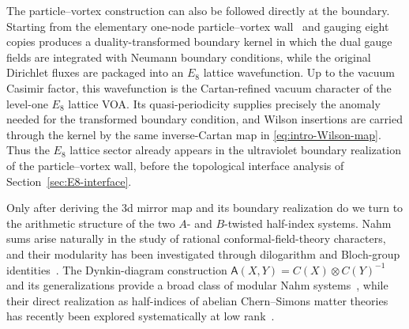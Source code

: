 \documentclass[11pt,a4paper]{article}
\numberwithin{equation}{section}
\begin{document}
The particle--vortex construction can also be followed directly at the boundary.  Starting from the elementary one-node particle--vortex wall~\cite{Dimofte:2017tpi} and gauging eight copies produces a duality-transformed boundary kernel in which the dual gauge fields are integrated with Neumann boundary conditions, while the original Dirichlet fluxes are packaged into an $E_8$ lattice wavefunction.  Up to the vacuum Casimir factor, this wavefunction is the Cartan-refined vacuum character of the level-one $E_8$ lattice VOA.  Its quasi-periodicity supplies precisely the anomaly needed for the transformed boundary condition, and Wilson insertions are carried through the kernel by the same inverse-Cartan map in \eqref{eq:intro-Wilson-map}.  Thus the $E_8$ lattice sector already appears in the ultraviolet boundary realization of the particle--vortex wall, before the topological interface analysis of Section~\ref{sec:E8-interface}.

Only after deriving the 3d mirror map and its boundary realization do we turn to the arithmetic structure of the two $A$- and $B$-twisted half-index systems.  Nahm sums arise naturally in the study of rational conformal-field-theory characters, and their modularity has been investigated through dilogarithm and Bloch-group identities~\cite{Nahm:2004bloch,Zagier:2007dilogarithm,VlasenkoZwegers:2011nahm}.  The Dynkin-diagram construction $\mathsf A(X,Y)=C(X)\otimes C(Y)^{-1}$ and its generalizations provide a broad class of modular Nahm systems~\cite{SunWang:2026Dynkin}, while their direct realization as half-indices of abelian Chern--Simons matter theories has recently been explored systematically at low rank~\cite{GangKimParkStubbs:2024Nahm}.
\end{document}
